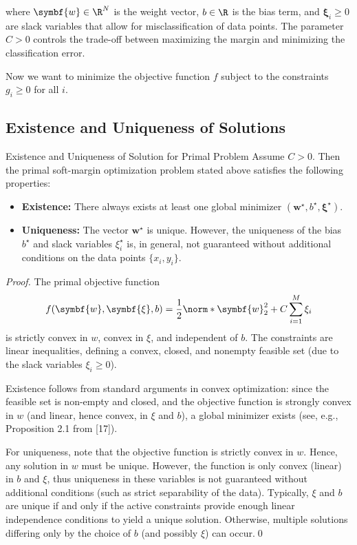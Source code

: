 where \(\symbf{w} \in \R^N\) is the weight vector, \(b \in \R\) is the bias term, and \(\symbf{\xi}_i \geq 0\) are slack variables that allow for misclassification of data points.
The parameter \(C > 0\) controls the trade-off between maximizing the margin and minimizing the classification error.

Now we want to minimize the objective function \(f\) subject to the constraints \(g_i \geq 0\) for all \(i\).

\subsection{Existence and Uniqueness of Solutions}

\begin{theorem}{Existence and Uniqueness of Solution for Primal Problem}{}
  Assume \(C > 0\). Then the primal soft-margin optimization problem stated above satisfies the following properties:
  \begin{itemize}
    \item[(i)] \textbf{Existence:} There always exists at least one global minimizer \((\symbf{w}^\star, b^\star, \symbf{\xi}^\star)\).
    \item[(ii)] \textbf{Uniqueness:} The vector \(\symbf{w}^\star\) is unique. However, the uniqueness of the bias \(b^\star\) and slack variables \(\xi_i^\star\) is, in general, not guaranteed without additional conditions on the data points \(\{x_i,y_i\}\).
  \end{itemize}
\end{theorem}

\begin{proof}{}{}
  The primal objective function
  \[
    f(\symbf{w}, \symbf{\xi}, b) = \frac{1}{2} \norm*{\symbf{w}}_2^2 + C \sum_{i=1}^M \xi_i
  \]
  is strictly convex in \( w \), convex in \(\xi\), and independent of \(b\). The constraints are linear inequalities, defining a convex, closed, and nonempty feasible set (due to the slack variables \(\xi_i\geq 0\)).

  Existence follows from standard arguments in convex optimization: since the feasible set is non-empty and closed, and the objective function is strongly convex in \(w\) (and linear, hence convex, in \(\xi\) and \(b\)), a global minimizer exists (see, e.g., Proposition 2.1 from [17]).

  For uniqueness, note that the objective function is strictly convex in \(w\). Hence, any solution in \(w\) must be unique. However, the function is only convex (linear) in \(b\) and \(\xi\), thus uniqueness in these variables is not guaranteed without additional conditions (such as strict separability of the data). Typically, \(\xi\) and \(b\) are unique if and only if the active constraints provide enough linear independence conditions to yield a unique solution. Otherwise, multiple solutions differing only by the choice of \(b\) (and possibly \(\xi\)) can occur.\qed
\end{proof}

